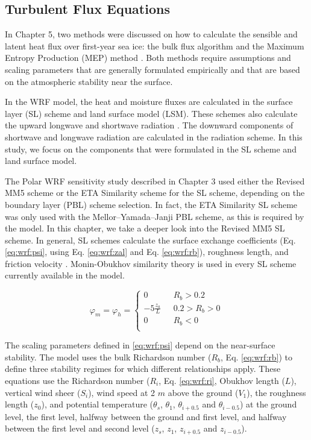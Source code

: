 \subsection{Turbulent Flux Equations}
In Chapter 5, two methods were discussed on how to calculate the sensible and latent heat flux over first-year sea ice: the bulk flux algorithm \citep{foken:2008} and the Maximum Entropy Production (MEP) method \citep{zhang:2021, wang:2014, wang:2009}. Both methods require assumptions and scaling parameters that are generally formulated empirically and that are based on the atmospheric stability near the surface. 

In the WRF model, the heat and moisture fluxes are calculated in the surface layer (SL) scheme and land surface model (LSM). These schemes also calculate the upward longwave and shortwave radiation \citep{dudhia:2014, skamarock:2019}. The downward components of shortwave and longwave radiation are calculated in the radiation scheme. In this study, we focus on the components that were formulated in the SL scheme and land surface model. 

The Polar WRF sensitivity study described in Chapter 3 used either the Revised MM5 scheme \citep{paulson:1970, dyer:1970, webb:1970, beljaars:1994} or the ETA Similarity scheme for the SL scheme, depending on the boundary layer (PBL) scheme selection. In fact, the ETA Similarity SL scheme was only used with the Mellor–Yamada–Janji PBL scheme, as this is required by the model. In this chapter, we take a deeper look into the Revised MM5 SL scheme. In general, SL schemes calculate the surface exchange coefficients (Eq. \ref{eq:wrf:psi}, using Eq. \ref{eq:wrf:zal} and Eq. \ref{eq:wrf:rb}), roughness length, and friction velocity \citep{dudhia:2014}. Monin-Obukhov similarity theory is used in every SL scheme currently available in the model. 

\begin{equation}\label{eq:wrf:psi}
\varphi_{m} = 
\varphi_{h} = \begin{cases} 
0 & \text{    } R_{b} > 0.2 \\ 
-5 \frac{z_{a}}{L} & \text{    } 0.2 > R_{b} > 0 \\ 
0 & \text{    } R_{b} < 0 \\ 
\end{cases}
\end{equation}

The scaling parameters defined in \ref{eq:wrf:psi} depend on the near-surface stability. The model uses the bulk Richardson number ($R_{b}$, Eq. \ref{eq:wrf:rb}) to define three stability regimes for which different relationships apply. These equations use the Richardson number ($R_{i}$, Eq. \ref{eq:wrf:ri}, Obukhov length ($L$), vertical wind sheer ($S_{i}$), wind speed at 2 $m$ above the ground ($V_{1}$), the roughness length ($z_{0}$), and potential temperature ($\theta_{s}$, $\theta_{1}$, $\theta_{i+0.5}$ and $\theta_{i-0.5}$) at the ground level, the first level, halfway between the ground and first level, and halfway between the first level and second level ($z_{s}$, $z_{1}$, $z_{i+0.5}$ and $z_{i-0.5}$). 

